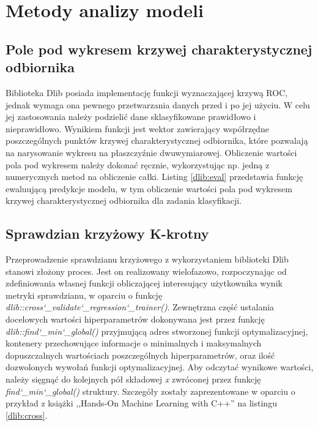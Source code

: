 
\section{Metody analizy modeli}

\subsection{Pole pod wykresem krzywej charakterystycznej odbiornika}

Biblioteka Dlib posiada implementację funkcji wyznaczającej krzywą ROC, jednak wymaga ona pewnego przetwarzania danych przed i po jej użyciu. W celu jej zastosowania należy podzielić dane sklasyfikowane prawidłowo i nieprawidłowo. Wynikiem funkcji jest wektor zawierający współrzędne poszczególnych punktów krzywej charakterystycznej odbiornika, które pozwalają na narysowanie wykresu na płaszczyźnie dwuwymiarowej. Obliczenie wartości pola pod wykresem należy dokonać ręcznie, wykorzystując np. jedną z numerycznych metod na obliczenie całki. Listing \ref{dlib:eval} przedstawia funkcję ewaluującą predykcje modelu, w tym obliczenie wartości pola pod wykresem krzywej charakterystycznej odbiornika dla zadania klasyfikacji.


\subsection{Sprawdzian krzyżowy K-krotny}

Przeprowadzenie sprawdzianu krzyżowego z wykorzystaniem biblioteki Dlib stanowi złożony proces. Jest on realizowany wielofazowo, rozpoczynając od zdefiniowania własnej funkcji obliczającej interesujący użytkownika wynik metryki sprawdzianu, w oparciu o funkcję \textit{dlib::cross\char`_validate\char`_regression\char`_trainer()}. Zewnętrzna część ustalania docelowych wartości hiperparametrów dokonywana jest przez funkcję \textit{dlib::find\char`_min\char`_global()} przyjmującą adres stworzonej funkcji optymalizacyjnej, kontenery przechowujące informacje o minimalnych i maksymalnych dopuszczalnych wartościach poszczególnych hiperparametrów, oraz ilość dozwolonych wywołań funkcji optymalizacyjnej. Aby odczytać wynikowe wartości, należy sięgnąć do kolejnych pół składowej \textit{x} zwróconej przez funkcję \textit{find\char`_min\char`_global()} struktury. Szczegóły zostały zaprezentowane w oparciu o przykład z książki ,,Hands-On Machine Learning with C++'' \cite{handsOnMachineLearning} na listingu \ref{dlib:cross}.

